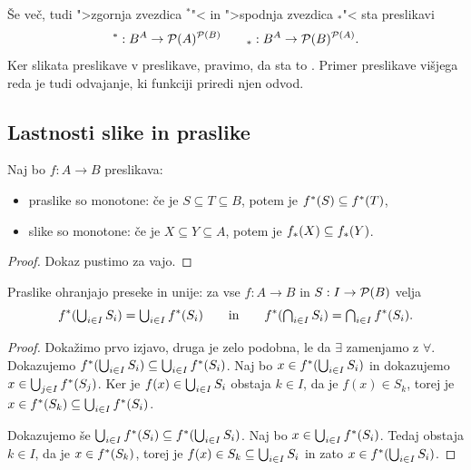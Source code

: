 Še več, tudi ">zgornja zvezdica $^{*}$"< in ">spodnja zvezdica $_{*}$"< sta preslikavi
%
\begin{equation*}
  {}^* : B^A \to \mathcal{P}(A)^{\mathcal{P}(B)} \qquad
  {}_* : B^A \to \mathcal{P}(B)^{\mathcal{P}(A)}.
\end{equation*}
%
Ker slikata preslikave v preslikave, pravimo, da sta to . Primer preslikave višjega reda je tudi odvajanje, ki funkciji priredi njen odvod.


\subsection{Lastnosti slike in praslike}
\label{sec:lastnosti-slike-praslike}

\begin{izrek}
  Naj bo $f : A \to B$ preslikava:
  \begin{itemize}
  \item praslike so monotone: če je $S \subseteq T \subseteq B$, potem je $f^{*}(S) \subseteq f^{*}(T)$,
  \item slike so monotone: če je $X \subseteq Y \subseteq A$, potem je $f_{*}(X) \subseteq f_{*}(Y)$.
  \end{itemize}
\end{izrek}

\begin{proof}
  Dokaz pustimo za vajo.
\end{proof}

\begin{izrek}
  Praslike ohranjajo preseke in unije: za vse $f : A \to B$ in $S : I \to \mathcal{P}(B)$ velja
  \begin{equation*}
    \invimg{f} (\Union{i \in I} S_i) = \Union{i \in I} \invimg{f}(S_i)
    \iinn
    \invimg{f} (\Inter{i \in I} S_i) = \Inter{i \in I} \invimg{f}(S_i).
  \end{equation*}
\end{izrek}

\begin{proof}
  Dokažimo prvo izjavo, druga je zelo podobna, le da $\exists$ zamenjamo z $\forall$.
  Dokazujemo $\invimg{f} (\Union{i \in I} S_i) \subseteq \Union{i \in I} \invimg{f}(S_i)$.
  Naj bo $x \in \invimg{f} (\Union{i \in I} S_i)$ in dokazujemo $x \in \Union{j \in I} \invimg{f}(S_j)$.
  Ker je $f(x) \in \Union{i \in I} S_i$ obstaja $k \in I$, da je $f(x) \in S_k$, torej je
  $x \in \invimg{f}(S_k) \subseteq \Union{i \in I} \invimg{f}(S_i)$.

  Dokazujemo še $\Union{i \in I} \invimg{f}(S_i) \subseteq \invimg{f} (\Union{i \in I} S_i)$.
  Naj bo $x \in \Union{i \in I} \invimg{f}(S_i)$. Tedaj obstaja $k \in I$, da je $x \in f^{*}(S_k)$, torej je
  $f(x) \in S_k \subseteq \Union{i \in I} S_i$ in zato $x \in \invimg{f} (\Union{i \in I} S_i)$.
\end{proof}

